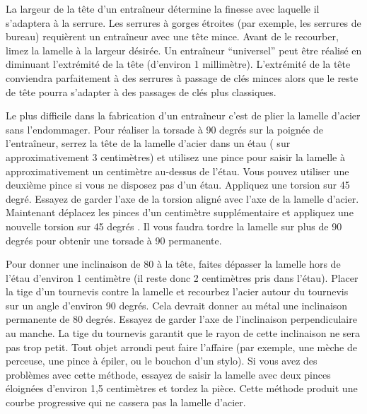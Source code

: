\documentclass[a4paper,french,11pt,twoside]{report}
\begin{document}
La largeur de la tête d'un entraîneur détermine la finesse avec laquelle il s'adaptera à la serrure. Les serrures à gorges étroites (par exemple, les serrures de bureau) requièrent un entraîneur avec une tête mince. Avant de le recourber, limez la lamelle à la largeur désirée. Un entraîneur \enquote{universel} peut être réalisé en diminuant l'extrémité de la tête (d'environ 1 millimètre). L'extrémité de la tête conviendra parfaitement à des serrures à passage de clés minces alors que le reste de tête pourra s'adapter à des passages de clés plus classiques.

Le plus difficile dans la fabrication d'un entraîneur c'est de plier la lamelle d'acier sans l'endommager. Pour réaliser la torsade à 90 degrés sur la poignée de l'entraîneur, serrez la tête de la lamelle d'acier dans un étau ( sur approximativement 3 centimètres) et utilisez une pince pour saisir la lamelle à approximativement un centimètre au-dessus de l'étau. Vous pouvez utiliser une deuxième pince si vous ne disposez pas d'un étau. Appliquez une torsion sur 45 degré. Essayez de garder l'axe de la torsion aligné avec l'axe de la lamelle d'acier. Maintenant déplacez les pinces d'un centimètre supplémentaire et appliquez une nouvelle torsion sur 45 degrés . Il vous faudra tordre la lamelle sur plus de 90 degrés pour obtenir une torsade à 90 permanente.

Pour donner une inclinaison de 80 à la tête, faites dépasser la lamelle hors de l'étau d'environ 1 centimètre (il reste donc 2 centimètres pris dans l'étau). Placer la tige d'un tournevis contre la lamelle et recourbez l'acier autour du tournevis sur un angle d'environ 90 degrés. Cela devrait donner au métal une inclinaison permanente de 80 degrés. Essayez de garder l'axe de l'inclinaison perpendiculaire au manche. La tige du tournevis garantit que le rayon de cette inclinaison ne sera pas trop petit. Tout objet arrondi peut faire l'affaire (par exemple, une mèche de perceuse, une pince à épiler, ou le bouchon d'un stylo). Si vous avez des problèmes avec cette méthode, essayez de saisir la lamelle avec deux pinces éloignées d'environ 1,5 centimètres et tordez la pièce. Cette méthode produit une courbe progressive qui ne cassera pas la lamelle d'acier.
\end{document}
